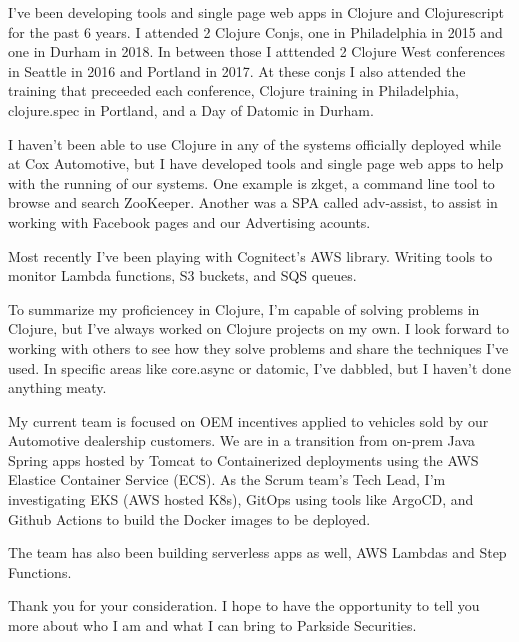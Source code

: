 \documentclass[11pt, letterpaper]{awesome-cv}
\begin{document}
\begin{cvletter}
 I've been developing tools and single
page web apps in Clojure and Clojurescript for the past 6 years.  I
attended 2 Clojure Conjs, one in Philadelphia in 2015 and one in
Durham in 2018. In between those I atttended 2 Clojure West
conferences in Seattle in 2016 and Portland in 2017.  At these conjs I
also attended the training that preceeded each conference, Clojure
training in Philadelphia, clojure.spec in Portland, and a Day of
Datomic in Durham.

I haven't been able to use Clojure in any of the systems officially
deployed while at Cox Automotive, but I have developed tools and
single page web apps to help with the running of our systems.  One
example is zkget, a command line tool to browse and search ZooKeeper.
Another was a SPA called adv-assist, to assist in working with
Facebook pages and our Advertising acounts.

Most recently I've been playing with Cognitect's AWS library.  Writing
tools to monitor Lambda functions, S3 buckets, and SQS queues.

To summarize my proficiencey in Clojure, I'm capable of solving
problems in Clojure, but I've always worked on Clojure projects on my
own.  I look forward to working with others to see how they solve
problems and share the techniques I've used.  In specific areas like
core.async or datomic, I've dabbled, but I haven't done anything
meaty. 

My current team is focused on OEM incentives applied to vehicles sold
by our Automotive dealership customers.  We are in a transition from
on-prem Java Spring apps hosted by Tomcat to Containerized deployments
using the AWS Elastice Container Service (ECS).  As the Scrum team's
Tech Lead, I'm investigating EKS (AWS hosted K8s), GitOps using tools
like ArgoCD, and Github Actions to build the Docker images to be
deployed.

The team has also been building serverless apps as well, AWS Lambdas and Step Functions.


Thank you for your consideration.  I hope to have the opportunity to
tell you more about who I am and what I can bring to Parkside
Securities.

\end{cvletter}


\makeletterclosing
\end{document}
